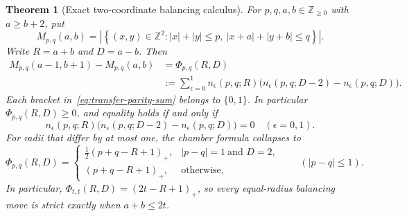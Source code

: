\documentclass[pdflatex,sn-mathphys-num]{sn-jnl}
\theoremstyle{thmstyleone}
\newtheorem{theorem}{Theorem}[section]
\theoremstyle{thmstylethree}
\theoremstyle{thmstyletwo}
\newcommand{\Z}{\mathbb Z}
\begin{document}
\begin{theorem}[Exact two-coordinate balancing calculus]
\label{thm:transfer-calculus}
For $p,q,a,b\in\Z_{\ge0}$ with $a\ge b+2$, put
\[
 M_{p,q}(a,b)=\left|\left\{(x,y)\in\Z^2:
 |x|+|y|\le p,\ |x+a|+|y+b|\le q\right\}\right|.
\]
Write $R=a+b$ and $D=a-b$.  Then
\begin{align}
 M_{p,q}(a-1,b+1)-M_{p,q}(a,b)
 &=\Phi_{p,q}(R,D)                                      \label{eq:transfer-kernel}\\
 &:=\sum_{\epsilon=0}^1 n_\epsilon(p,q;R)
 \bigl(n_\epsilon(p,q;D-2)-n_\epsilon(p,q;D)\bigr).    \label{eq:transfer-parity-sum}
\end{align}
Each bracket in~\eqref{eq:transfer-parity-sum} belongs to $\{0,1\}$.  In
particular $\Phi_{p,q}(R,D)\ge0$, and equality holds if and only if
\begin{equation}
 n_\epsilon(p,q;R)
 \bigl(n_\epsilon(p,q;D-2)-n_\epsilon(p,q;D)\bigr)=0
 \quad(\epsilon=0,1).                                  \label{eq:local-equality}
\end{equation}
For radii that differ by at most one, the chamber formula collapses to
\begin{equation}
 \Phi_{p,q}(R,D)=
 \begin{cases}
  \frac12(p+q-R+1)_+,& |p-q|=1\ \text{and }D=2,\\[2pt]
  (p+q-R+1)_+,&\text{otherwise},
 \end{cases}
 \qquad (|p-q|\le1).                                  \label{eq:near-equal-transfer-linear}
\end{equation}
In particular,
$\Phi_{t,t}(R,D)=(2t-R+1)_+$, so every equal-radius balancing move is
strict exactly when $a+b\le2t$.
\end{theorem}
\end{document}
